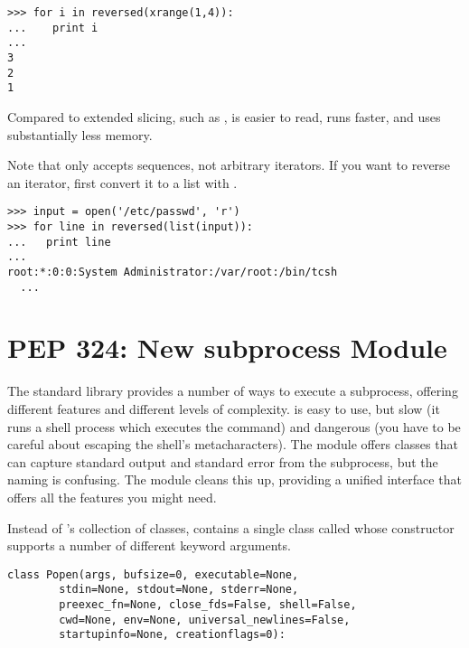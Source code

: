 \documentclass{howto}
\begin{document}
\begin{verbatim}
>>> for i in reversed(xrange(1,4)):
...    print i
... 
3
2
1
\end{verbatim}

Compared to extended slicing, such as ,
 is easier to read, runs faster, and uses
substantially less memory.

Note that  only accepts sequences, not arbitrary
iterators.  If you want to reverse an iterator, first convert it to 
a list with .

\begin{verbatim}
>>> input = open('/etc/passwd', 'r')
>>> for line in reversed(list(input)):
...   print line
... 
root:*:0:0:System Administrator:/var/root:/bin/tcsh
  ...
\end{verbatim}

\begin{seealso}

\end{seealso}


\section{PEP 324: New subprocess Module}

The standard library provides a number of ways to execute a
subprocess, offering different features and different levels of
complexity.   is easy to use, but
slow (it runs a shell process which executes the command) and
dangerous (you have to be careful about escaping the shell's
metacharacters).  The  module offers classes that can
capture standard output and standard error from the subprocess, but
the naming is confusing.  The  module cleans 
this up, providing a unified interface that offers all the features
you might need.

Instead of 's collection of classes,
 contains a single class called  
whose constructor supports a number of different keyword arguments.

\begin{verbatim}
class Popen(args, bufsize=0, executable=None,
	    stdin=None, stdout=None, stderr=None,
	    preexec_fn=None, close_fds=False, shell=False,
	    cwd=None, env=None, universal_newlines=False,
	    startupinfo=None, creationflags=0):
\end{verbatim}
\end{document}

